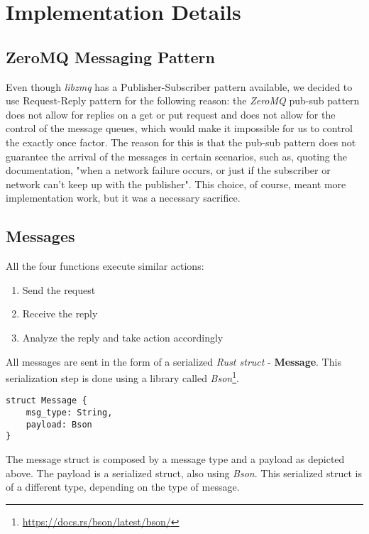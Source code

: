 \section{Implementation Details}
\label{sec:Implementation}

\subsection{ZeroMQ Messaging Pattern}
Even though \emph{libzmq} has a Publisher-Subscriber pattern available, we decided to use Request-Reply pattern for the following reason: the \emph{ZeroMQ} pub-sub pattern does not allow for replies on a get or put request and does not allow for the control of the message queues, which would make it impossible for us to control the exactly once factor. The reason for this is that the pub-sub pattern does not guarantee the arrival of the messages in certain scenarios, such as, quoting the documentation, "when a network failure occurs, or just if the subscriber or network can’t keep up with the publisher"\cite[Chapter~5]{zeromqguide}. This choice, of course, meant more implementation work, but it was a necessary sacrifice.


\subsection{Messages} 

All the four functions execute similar actions:

\begin{enumerate}
    \item Send the request
    \item Receive the reply
    \item Analyze the reply and take action accordingly
\end{enumerate}

All messages are sent in the form of a serialized \emph{Rust struct} - \textbf{Message}. This serialization step is done using a library called \emph{Bson}\footnote{\url{https://docs.rs/bson/latest/bson/}}. 

\begin{lstlisting}
struct Message {
    msg_type: String,
    payload: Bson
}
\end{lstlisting}

The message struct is composed by a message type and a payload as depicted above. The payload is a serialized struct, also using \emph{Bson}. This serialized struct is of a different type, depending on the type of message. 


